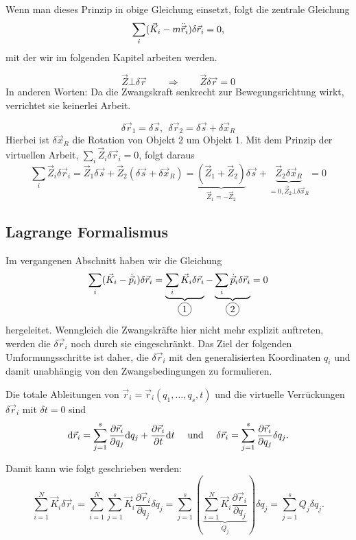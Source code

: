 Wenn man dieses Prinzip in obige Gleichung einsetzt, folgt die zentrale Gleichung
\[
	\sum_i (\vec{K}_i - m \ddot{\vec{r}}_i) \delta \vec{r}_i = 0
	\text{,}
\]
mit der wir im folgenden Kapitel arbeiten werden.

\begin{beispiel*}
$$\vec{Z} \bot \delta \vec{r} \qquad \Rightarrow \qquad \vec{Z} \delta \vec{r} = 0$$
In anderen Worten: Da die Zwangskraft senkrecht zur Bewegungsrichtung wirkt, verrichtet sie keinerlei Arbeit. 
\end{beispiel*}

\begin{beispiel*}[Hantel]
$$\delta \vec{r}_1 = \delta\vec{s},~~ \delta \vec{r}_2 = \delta \vec{s} + \delta \vec{x}_R$$
Hierbei ist $\delta \vec{x}_R$ die Rotation von Objekt 2 um Objekt 1.
Mit dem Prinzip der virtuellen Arbeit, $\sum_i \vec{Z}_i \delta \vec{r}_i = 0$, folgt daraus
$$\sum_i \vec Z_i \delta \vec{r}_i = \vec{Z}_1 \delta \vec{s} + \vec{Z}_2 (\delta \vec{s} + \delta \vec{x}_R) 
= \underbrace{(\vec{Z}_1 + \vec{Z}_2)}_{\vec{Z}_1 = - \vec{Z}_2} \delta \vec{s} + \underbrace{\vec{Z}_2 \delta \vec{x}_R}_{= 0, \vec{Z}_2 \bot \delta \vec{x}_R} = 0$$
\end{beispiel*}

\subsection{Lagrange Formalismus}
Im vergangenen Abschnitt haben wir die Gleichung
\[
	\sum_i (\vec{K}_i - \dot{\vec{p}}_i) \delta \vec{r}_i 
	= \underbrace{\sum_i \vec{K}_i \delta\vec{r}_i}_{\circled{1}} 
	  - \underbrace{\sum_i \dot{\vec{p}}_i \delta\vec{r}_i}_{\circled{2}} 
	= 0
\]
hergeleitet. Wenngleich die Zwangskräfte hier nicht mehr explizit auftreten, werden die $\delta \vec{r}_i$ noch durch sie eingeschränkt. Das Ziel der folgenden Umformungsschritte ist daher, die $\delta \vec{r}_i$ mit den generalisierten Koordinaten $q_i$ und damit unabhängig von den Zwangsbedingungen zu formulieren. 

Die totale Ableitungen von $\vec{r}_i = \vec{r}_i(q_1, \dots, q_s, t)$ und die virtuelle Verrückungen $\delta \vec{r}_i$ mit $\delta t = 0$ sind
\[
	\mathrm d \vec{r}_i = \sum_{j = 1}^{s} \frac{\partial \vec{r}_i}{\partial q_j} \mathrm d q_j + \frac{\partial \vec{r}_i}{\partial t} \mathrm d t 
	\quad \text{ und } \quad
	\delta \vec{r}_i = \sum_{j = 1}^s \frac{\partial \vec{r}_i}{\partial q_j} \delta q_j
	\text{.}
\]

Damit kann   wie folgt geschrieben werden:
\[
	\sum_{i = 1}^N \vec{K}_i \delta \vec{r}_i 
	= \sum_{i=1}^N \sum_{j = 1}^s \vec{K}_i \frac{\partial \vec{r}_i}{\partial q_j} \delta q_j
	= \sum_{j=1}^s \left( \underbrace{\sum_{i = 1}^N \vec{K}_i \frac{\partial \vec{r}_i}{\partial q_j}}_{Q_j} \right) \delta q_j
	= \sum_{j = 1}^s Q_j \delta q_j
	\text{.}
\]

